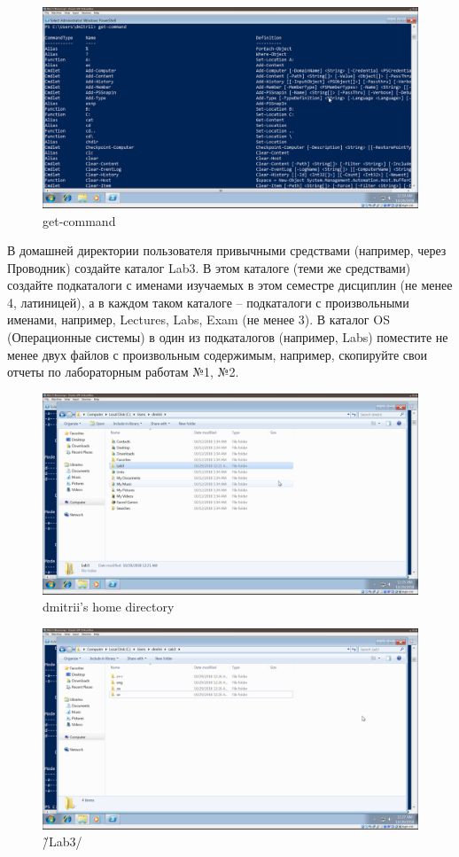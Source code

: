 \documentclass[a4paper]{article}
\begin{document}
\begin{figure}[H]
    \centering
    \includegraphics[width=\linewidth]{3.png}
    \caption{get-command}
\end{figure}

В домашней директории пользователя привычными средствами (например, через Проводник) создайте каталог Lab3. В этом каталоге (теми же средствами) создайте подкаталоги с именами изучаемых в этом семестре дисциплин (не менее 4, латиницей), а в каждом таком каталоге – подкаталоги с произвольными именами, например, Lectures, Labs, Exam (не менее 3). В каталог OS (Операционные системы) в один из подкаталогов (например, Labs) поместите не менее двух файлов с произвольным содержимым, например, скопируйте свои отчеты по лабораторным работам №1, №2.

\begin{figure}[H]
    \centering
    \includegraphics[width=\linewidth]{5.png}
    \caption{dmitrii's home directory}
\end{figure}

\begin{figure}[H]
    \centering
    \includegraphics[width=\linewidth]{6.png}
    \caption{\~/Lab3/}
\end{figure}
\end{document}
